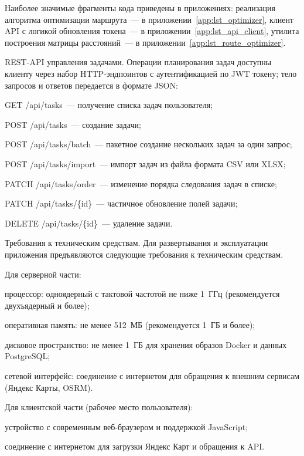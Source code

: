 Наиболее значимые фрагменты кода приведены в приложениях: реализация
алгоритма оптимизации маршрута~--- в приложении~\ref{app:lst_optimizer},
клиент API с логикой обновления токена~--- в приложении~\ref{app:lst_api_client},
утилита построения матрицы расстояний~--- в приложении~\ref{app:lst_route_optimizer}.

REST-API управления задачами. Операции планирования задач доступны клиенту
через набор HTTP-эндпоинтов с аутентификацией по JWT токену; тело запросов и
ответов передается в формате JSON:

\begin{compactlist}
  \item GET /api/tasks~--- получение списка задач пользователя;
  \item POST /api/tasks~--- создание задачи;
  \item POST /api/tasks/batch~--- пакетное создание нескольких задач за один запрос;
  \item POST /api/tasks/import~--- импорт задач из файла формата CSV или XLSX;
  \item PATCH /api/tasks/order~--- изменение порядка следования задач в списке;
  \item PATCH /api/tasks/\{id\}~--- частичное обновление полей задачи;
  \item DELETE /api/tasks/\{id\}~--- удаление задачи.
\end{compactlist}

Требования к техническим средствам. Для развертывания и эксплуатации приложения предъявляются следующие
требования к техническим средствам.

Для серверной части:

\begin{compactlist}
  \item процессор: одноядерный с тактовой частотой не ниже 1~ГГц
        (рекомендуется двухъядерный и более);
  \item оперативная память: не менее 512~МБ (рекомендуется 1~ГБ и более);
  \item дисковое пространство: не менее 1~ГБ для хранения образов Docker
        и данных PostgreSQL;
  \item сетевой интерфейс: соединение с интернетом для обращения к внешним
        сервисам (Яндекс Карты, OSRM).
\end{compactlist}

Для клиентской части (рабочее место пользователя):

\begin{compactlist}
  \item устройство с современным веб-браузером и поддержкой JavaScript;
  \item соединение с интернетом для загрузки Яндекс Карт и обращения к API.
\end{compactlist}

